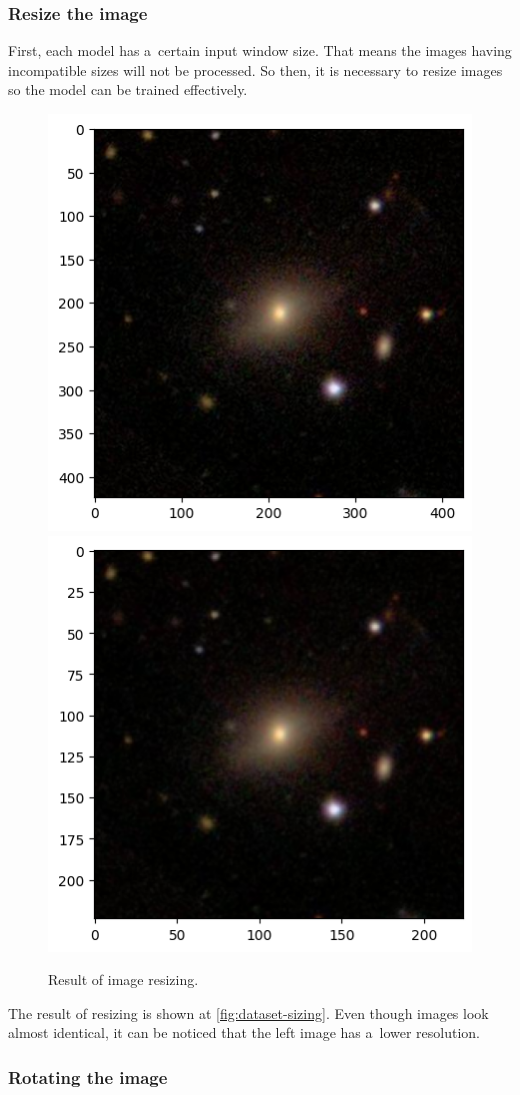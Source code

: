 \subsubsection*{Resize the image}

First, each model has a~certain input window size. That means the images having incompatible sizes will not be processed. So then, it is necessary to resize images so the model can be trained effectively. 

\begin{figure}[htbp]\centering
  \centering
  \includegraphics[width=0.5\linewidth]{obrazky-figures/03-dataset/orig.png}\hfill
  \includegraphics[width=0.5\linewidth]{obrazky-figures/03-dataset/resize.png}
  \caption{Result of image resizing.}
  \label{fig:dataset-sizing}
\end{figure}

The result of resizing is shown at \autoref{fig:dataset-sizing}. Even though images look almost identical, it can be noticed that the left image has a~lower resolution.

\subsubsection*{Rotating the image}


